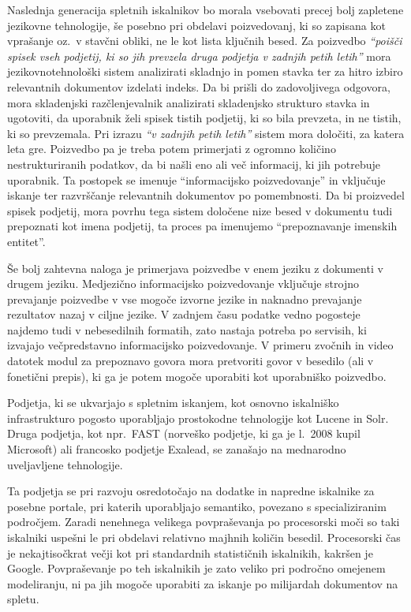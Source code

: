 \begin{multicols}{2}
Naslednja generacija spletnih iskalnikov bo morala vsebovati precej bolj zapletene jezikovne tehnologije, še posebno pri obdelavi poizvedovanj, ki so zapisana kot vprašanje oz.~v stavčni obliki, ne le kot lista ključnih besed. Za poizvedbo \textit{“poišči spisek vseh podjetij, ki so jih prevzela druga podjetja v zadnjih petih letih”} mora jezikovnotehnološki sistem analizirati skladnjo in po\-men stavka ter za hitro izbiro relevantnih dokumentov izdelati indeks. Da bi prišli do zadovoljivega odgo\-vora, mora skladenj\-ski razčlenjevalnik analizirati skladenjsko strukturo stavka in ugotoviti, da uporabnik želi spisek tistih podjetij, ki so bila prevzeta, in ne tistih, ki so prevzemala. Pri izrazu \textit{“v zadnjih petih letih”} sistem mora določiti, za katera leta gre. Poizvedbo pa je treba potem primerjati z ogromno količino nestrukturiranih podatkov, da bi našli eno ali več informacij, ki jih potrebuje uporabnik. Ta postopek se imenuje “informacij\-sko poizvedovanje” in vključuje iskanje ter razvrščanje relevantnih dokumentov po pomembnosti. Da bi proizvedel spisek podjetij, mora povrhu tega sistem določene nize besed v dokumentu tudi prepoznati kot imena podjetij, ta proces pa imenujemo “prepoznavanje imenskih entitet”.
\columnbreak

Še bolj zah\-tevna naloga je primerjava poizvedbe v enem jeziku z dokumenti v drugem jeziku. Medjezično informacij\-sko poizvedovanje vključuje stroj\-no prevajanje poizvedbe v vse mogoče izvorne jezike in naknadno prevajanje rezultatov nazaj v ciljne jezike. V zadnjem času podatke vedno pogosteje naj\-demo tudi v nebesedilnih formatih, zato nastaja potreba po servisih, ki izvajajo večpredstavno informacij\-sko poizvedovanje. V primeru zvočnih in video datotek modul za prepoznavo go\-vora mora pretvoriti go\-vor v besedilo (ali v fonetični prepis), ki ga je potem mogoče uporabiti kot uporabniško poizvedbo.

Podjetja, ki se ukvarjajo s spletnim iskanjem, kot osnovno iskalniško infrastrukturo pogosto uporab\-ljajo prostokodne tehnologije kot Lucene in Solr. Druga podjetja, kot npr.~FAST (norveško podjetje, ki ga je l.~2008 kupil Microsoft) ali francosko podjetje Exalead, se zanašajo na mednarodno uveljav\-ljene tehnologije. 

Ta podjetja se pri razvoju osredotočajo na dodatke in napredne iskalnike za posebne portale, pri katerih uporab\-ljajo semantiko, povezano s specializiranim področjem. Zaradi nenehnega velikega povpraševanja po procesorski moči so taki iskalniki uspešni le pri obdelavi relativno majhnih količin besedil. Procesorski čas je nekajtisočkrat večji kot pri standardnih statističnih iskalnikih, kakršen je Google. Povpraševanje po teh iskalnikih je zato veliko pri področno omejenem mo\-deliranju, ni pa jih mogoče uporabiti za iskanje po mili\-jardah dokumentov na spletu.


\end{multicols}
